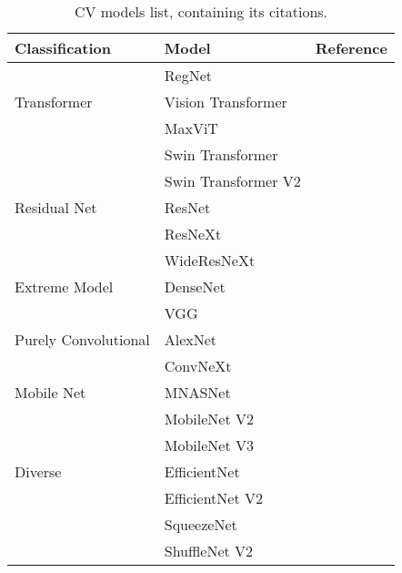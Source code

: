 
\begin{table}
	\centering
	\begin{tabular}{llc}
		\toprule	
		Classification 		& Model 		& Reference 			\\
 		\midrule	
 					& RegNet		& \cite{RegNet}			\\
		Transformer    		& Vision Transformer	& \cite{VisionTransformer}	\\
			   		& MaxViT		& \cite{MaxViT}			\\
			   		& Swin Transformer	& \cite{SwinTransformer}	\\
			   		& Swin Transformer V2	& \cite{SwinTransformerV2}	\\
		Residual Net   		& ResNet		& \cite{ResNet}			\\
			 		& ResNeXt		& \cite{ResNeXt}		\\
			 		& WideResNeXt		& \cite{WideResNet}		\\
		Extreme Model   	& DenseNet		& \cite{DenseNet}		\\
				 	& VGG			& \cite{VGG}			\\
		Purely Convolutional  	& AlexNet		& \cite{AlexNet}		\\
					& ConvNeXt		& \cite{ConvNeXt}		\\
		Mobile Net 		& MNASNet		& \cite{MNASNet}		\\
					& MobileNet V2		& \cite{MobileNetV2}		\\
					& MobileNet V3		& \cite{MobileNetV3}		\\
		Diverse			& EfficientNet		& \cite{EfficientNet}		\\
					& EfficientNet V2	& \cite{EfficientNetV2}		\\
					& SqueezeNet		& \cite{SqueezeNet}		\\
					& ShuffleNet V2		& \cite{ShuffleNetV2}		\\
		\bottomrule
	\end{tabular}
	\caption{\acrlong{CV} models list, containing its citations.}
	\label{tab:cv_list}
\end{table}
